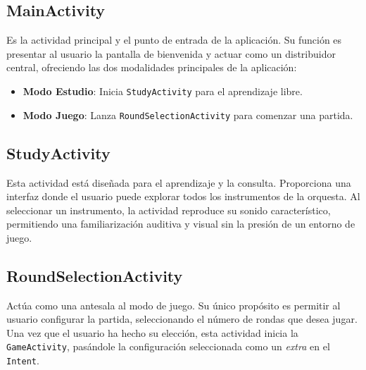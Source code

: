\documentclass{article}
\newcommand{\iconpath}{/home/khz/git/tabler-icons/icons/outline-white/}
\newcommand{\icon}[1]{}
\begin{document}
\subsection{MainActivity \icon{layout-dashboard}}
Es la actividad principal y el punto de entrada de la aplicación. Su función es presentar al usuario la pantalla de bienvenida y actuar como un distribuidor central, ofreciendo las dos modalidades principales de la aplicación:
\begin{itemize}
    \item \textbf{Modo Estudio}: Inicia \texttt{StudyActivity} para el aprendizaje libre.
    \item \textbf{Modo Juego}: Lanza \texttt{RoundSelectionActivity} para comenzar una partida.
\end{itemize}

\subsection{StudyActivity \icon{book}}
Esta actividad está diseñada para el aprendizaje y la consulta. Proporciona una interfaz donde el usuario puede explorar todos los instrumentos de la orquesta. Al seleccionar un instrumento, la actividad reproduce su sonido característico, permitiendo una familiarización auditiva y visual sin la presión de un entorno de juego.

\subsection{RoundSelectionActivity \icon{list}}
Actúa como una antesala al modo de juego. Su único propósito es permitir al usuario configurar la partida, seleccionando el número de rondas que desea jugar. Una vez que el usuario ha hecho su elección, esta actividad inicia la \texttt{GameActivity}, pasándole la configuración seleccionada como un \textit{extra} en el \texttt{Intent}.
\end{document}
